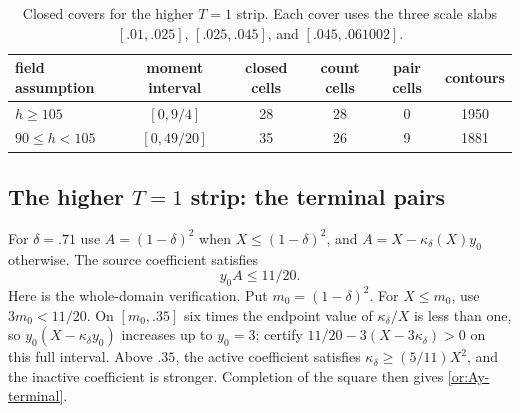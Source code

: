 \documentclass[11pt,reqno]{amsart}
\numberwithin{equation}{section}
\theoremstyle{definition}
\theoremstyle{remark}
\begin{document}
\begin{table}[ht]
\centering
\caption{Closed covers for the higher $T=1$ strip.  Each cover uses
the three scale slabs $[.01,.025]$, $[.025,.045]$, and
$[.045,.061002]$.}\label{or:T-cover}
\begin{tabular}{@{}lccccc@{}}
\toprule
field assumption&moment interval&closed cells&count cells&pair cells&contours\\
\midrule
$h\ge105$&$[0,9/4]$&28&28&0&1950\\
$90\le h<105$&$[0,49/20]$&35&26&9&1881\\
\bottomrule
\end{tabular}
\end{table}

\subsection{The higher $T=1$ strip: the terminal pairs}

For $\delta=.71$ use $A=(1-\delta)^2$ when
$X\le(1-\delta)^2$, and $A=X-\kappa_\delta(X)y_0$ otherwise.
The source coefficient satisfies
\begin{equation}\label{or:Ay-terminal}
                             y_0 A\le11/20.
\end{equation}
Here is the whole-domain verification.  Put $m_0=(1-\delta)^2$.
For $X\le m_0$, use $3m_0<11/20$.  On $[m_0,.35]$ six times
the endpoint value of $\kappa_\delta/X$ is less than one, so
$y_0(X-\kappa_\delta y_0)$ increases up to $y_0=3$; certify
$11/20-3(X-3\kappa_\delta)>0$ on this full interval.
Above $.35$, the active coefficient satisfies
$\kappa_\delta\ge(5/11)X^2$, and the inactive coefficient is stronger.
Completion of the square then gives \eqref{or:Ay-terminal}.
\end{document}
